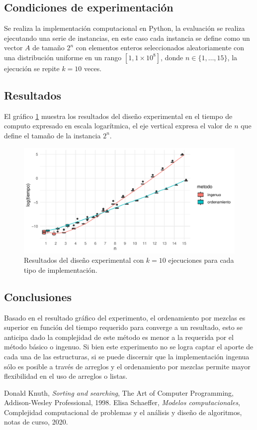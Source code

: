 \documentclass[letterpaper,11pt]{article}
\begin{document}
\subsection{Condiciones de experimentación}
Se realiza la implementación computacional en Python, la evaluación se realiza ejecutando una serie de instancias, en este caso cada instancia se define como un vector $A$ de tamaño ${2^n}$ con elementos enteros seleccionados aleatoriamente con una distribución uniforme en un rango $[1,1\times 10^8]$, donde $n\in \{1,\dots,15\}$, la ejecución se repite $k=10$ veces.

\subsection{Resultados}
El gráfico \ref{fig:bs} muestra los resultados del diseño experimental en el tiempo de computo expresado en escala logarítmica, el eje vertical expresa el valor de $n$ que define el tamaño de la instancia ${2^n}$. 

\begin{figure}[h]
 \centering
  \includegraphics[width=11.5cm]{img/A7.pdf}
  \caption{Resultados del diseño experimental con $k=10$ ejecuciones para cada tipo de implementación.}
  \label{fig:bs}
\end{figure}

\subsection{Conclusiones}

Basado en el resultado gráfico del experimento, el ordenamiento por mezclas es superior en función del tiempo requerido para converge a un resultado, esto se anticipa dado la complejidad de este método es menor a la requerida por el método básico o ingenuo. Si bien este experimento no se logra captar el aporte de cada una de las estructuras, si se puede discernir que la implementación ingenua sólo es posible a través de arreglos y el ordenamiento por mezclas permite mayor flexibilidad en el uso de arreglos o listas.


\begin{thebibliography}{0}
   Donald Knuth, \textit{Sorting and searching}, The Art of Computer Programming, Addison-Wesley Professional, 1998.
   Elisa Schaeffer, \textit{Modelos computacionales}, Complejidad computacional de problemas y el análisis y diseño de algoritmos, notas de curso, 2020.
\end{thebibliography}
\end{document}
